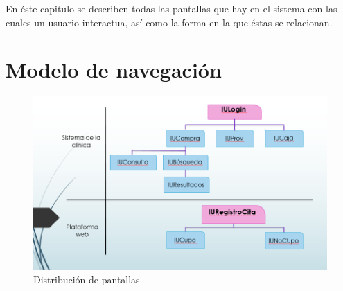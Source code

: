En \'este capitulo se describen todas las pantallas que hay en el sistema con las cuales un usuario interactua, as\'i como la forma en la que \'estas se relacionan.

\section{Modelo de navegación}



\begin{figure}[htbp]
	\begin{center}
		\includegraphics[width=.9\textwidth]{images/gui/nav-pantallas}
		\caption{Distribuci\'on de pantallas}
		\label{fig:mapa}
	\end{center}
\end{figure}
